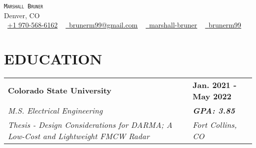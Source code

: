 \documentclass[11pt]{article}
\newcommand{\name}[6]{
  \begin{center}
    {\Huge \scshape \texttt{#1}} \\ \vspace{1mm}
    #2 \\ \vspace{1mm}
    \small \raisebox{-0.1\height}\faPhone \ \underline{#3} ~
    \href{mailto:#4}{\raisebox{-0.1\height} \faEnvelope \  \underline{#4}} ~
    \href{https://linkedin.com/in/#5}{\raisebox{-0.1\height} \faLinkedinSquare \  \underline{#5}} ~
    \href{https://github.com/#6}{\raisebox{-0.1\height} \faGithub \  \underline{#6}}
  \end{center}\par
}
\newcommand{\school}[7]{
  \vspace{-1.5mm}
\begin{tabularx}{\textwidth}{
    p{10cm}
    >{\raggedleft\arraybackslash}X
}
\textbf{#1} & \textbf{#4 - #5} \\
\textit{#2} & \textit{\textbf{GPA: #3}} \\
\textit{#6} & \textit{#7} \\
\end{tabularx}
}
\begin{document}
\name{Marshall Bruner}{Denver, CO}{+1 970-568-6162}{brunerm99@gmail.com}{marshall-bruner}{brunerm99}

\section*{EDUCATION} \vspace{-1.5mm}
\school{Colorado State University}{M.S. Electrical Engineering}{3.85}{Jan. 2021}{May 2022}{Thesis - Design Considerations for DARMA; A Low-Cost and Lightweight FMCW Radar}{Fort Collins, CO}
\end{document}
